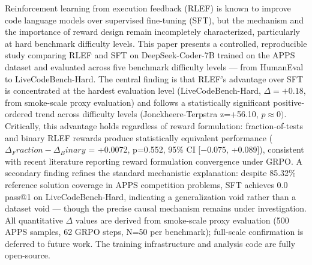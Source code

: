 
Reinforcement learning from execution feedback (RLEF) is known to improve code language models over supervised fine-tuning (SFT), but the mechanism and the importance of reward design remain incompletely characterized, particularly at hard benchmark difficulty levels. This paper presents a controlled, reproducible study comparing RLEF and SFT on DeepSeek-Coder-7B trained on the APPS dataset and evaluated across five benchmark difficulty levels --- from HumanEval to LiveCodeBench-Hard. The central finding is that RLEF's advantage over SFT is concentrated at the hardest evaluation level (LiveCodeBench-Hard, $\Delta =+0.18$, from smoke-scale proxy evaluation) and follows a statistically significant positive-ordered trend across difficulty levels (Jonckheere-Terpstra z=+56.10, $p\approx 0)$. Critically, this advantage holds regardless of reward formulation: fraction-of-tests and binary RLEF rewards produce statistically equivalent performance ($\Delta _Fraction - \Delta _Binary$ = +0.0072, p=0.552, 95\% CI [$-0.075$, +0.089]), consistent with recent literature reporting reward formulation convergence under GRPO. A secondary finding refines the standard mechanistic explanation: despite 85.32\% reference solution coverage in APPS competition problems, SFT achieves 0.0 pass@1 on LiveCodeBench-Hard, indicating a generalization void rather than a dataset void --- though the precise causal mechanism remains under investigation. All quantitative $\Delta$ values are derived from smoke-scale proxy evaluation (500 APPS samples, 62 GRPO steps, N=50 per benchmark); full-scale confirmation is deferred to future work. The training infrastructure and analysis code are fully open-source.

